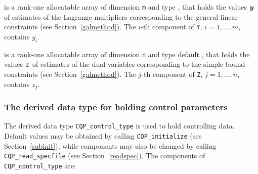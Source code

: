 \documentclass{galahad}
\newcommand{\packagename}{CQP}
\begin{document}
\begin{description}
 is a rank-one allocatable array of dimension {\tt m} and type
\realdp, that holds
the values ${\bm{y}}$ of estimates  of the Lagrange multipliers
corresponding to the general linear constraints (see Section~\ref{galmethod}).
The $i$-th component of {\tt Y}, $i = 1,  \ldots ,  m$, contains $y_{i}$.

 is a rank-one allocatable array of dimension {\tt n} and type default
\realdp, that holds
the values ${\bm{z}}$ of estimates  of the dual variables
corresponding to the simple bound constraints (see Section~\ref{galmethod}).
The $j$-th component of {\tt Z}, $j = 1,  \ldots ,  n$, contains $z_{j}$.

\end{description}


\subsubsection{The derived data type for holding control
 parameters}\label{typecontrol}
The derived data type
{\tt \packagename\_control\_type}
is used to hold controlling data. Default values may be obtained by calling
{\tt \packagename\_initialize}
(see Section~\ref{subinit}),
while components may also be changed by calling
{\tt \packagename\_read\-\_specfile}
(see Section~\ref{readspec}).
The components of
{\tt \packagename\_control\_type}
are:



\end{document}
